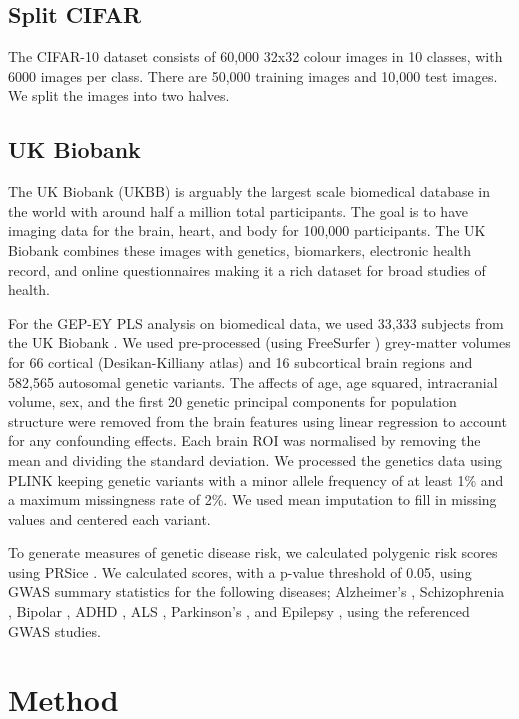 \subsection{Split CIFAR}
The CIFAR-10 dataset \cite{krizhevsky2009learning} consists of 60,000 32x32 colour images in 10 classes, with 6000 images per class. There are 50,000 training images and 10,000 test images. We split the images into two halves.

\subsection{UK Biobank}
The UK Biobank (UKBB) is arguably the largest scale biomedical database in the world with around half a million total participants. The goal is to have imaging data for the brain, heart, and body for 100,000 participants. The UK Biobank combines these images with genetics, biomarkers, electronic health record, and online questionnaires making it a rich dataset for broad studies of health.

For the GEP-EY PLS analysis on biomedical data, we used 33,333 subjects from the UK Biobank \cite{sudlow2015uk}. We used pre-processed (using FreeSurfer \cite{Fischl2012}) grey-matter volumes for 66 cortical (Desikan-Killiany atlas) and 16 subcortical brain regions and 582,565 autosomal genetic variants. The affects of age, age squared, intracranial volume, sex, and the first 20 genetic principal components for population structure were removed from the brain features using linear regression to account for any confounding effects. Each brain ROI was normalised by removing the mean and dividing the standard deviation. We processed the genetics data using PLINK \cite{Purcell2007} keeping genetic variants with a minor allele frequency of at least 1\%  and a maximum missingness rate of 2\%. We used mean imputation to fill in missing values and centered each variant.

To generate measures of genetic disease risk, we calculated polygenic risk scores using PRSice \cite{PRSice2014}. We calculated scores, with a p-value threshold of 0.05, using GWAS summary statistics for the following diseases; Alzheimer's \cite{Lambert2013}, Schizophrenia \cite{Trubetskoy2022}, Bipolar \cite{Mullins2021}, ADHD \cite{Demontis2023}, ALS \cite{Van_Rheenen2021}, Parkinson's \cite{Nalls2019}, and Epilepsy \cite{International_League_Against_Epilepsy_Consortium_on_Complex_Epilepsies2018}, using the referenced GWAS studies.


\section{Method}

